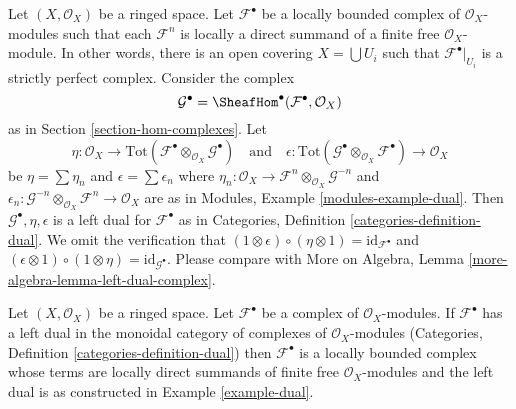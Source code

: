 \begin{example}
\label{example-dual}
Let $(X, \mathcal{O}_X)$ be a ringed space. Let $\mathcal{F}^\bullet$
be a locally bounded complex of $\mathcal{O}_X$-modules such that each
$\mathcal{F}^n$ is locally a direct summand of a finite
free $\mathcal{O}_X$-module. In other words, there is an open covering
$X = \bigcup U_i$ such that $\mathcal{F}^\bullet|_{U_i}$ is a strictly
perfect complex. Consider the complex
$$
\mathcal{G}^\bullet = \SheafHom^\bullet(\mathcal{F}^\bullet, \mathcal{O}_X)
$$
as in Section \ref{section-hom-complexes}. Let
$$
\eta :
\mathcal{O}_X
\to
\text{Tot}(\mathcal{F}^\bullet \otimes_{\mathcal{O}_X} \mathcal{G}^\bullet)
\quad\text{and}\quad
\epsilon :
\text{Tot}(\mathcal{G}^\bullet \otimes_{\mathcal{O}_X} \mathcal{F}^\bullet)
\to
\mathcal{O}_X
$$
be $\eta = \sum \eta_n$ and $\epsilon = \sum \epsilon_n$
where $\eta_n : \mathcal{O}_X \to
\mathcal{F}^n \otimes_{\mathcal{O}_X} \mathcal{G}^{-n}$
and
$\epsilon_n : \mathcal{G}^{-n} \otimes_{\mathcal{O}_X} \mathcal{F}^n
\to \mathcal{O}_X$ are as in Modules, Example \ref{modules-example-dual}.
Then $\mathcal{G}^\bullet, \eta, \epsilon$
is a left dual for $\mathcal{F}^\bullet$ as in
Categories, Definition \ref{categories-definition-dual}.
We omit the verification that
$(1 \otimes \epsilon) \circ (\eta \otimes 1) = \text{id}_{\mathcal{F}^\bullet}$
and
$(\epsilon \otimes 1) \circ (1 \otimes \eta) =
\text{id}_{\mathcal{G}^\bullet}$. Please compare with
More on Algebra, Lemma \ref{more-algebra-lemma-left-dual-complex}.
\end{example}

\begin{lemma}
\label{lemma-left-dual-complex}
Let $(X, \mathcal{O}_X)$ be a ringed space. Let $\mathcal{F}^\bullet$
be a complex of $\mathcal{O}_X$-modules. If $\mathcal{F}^\bullet$
has a left dual in the monoidal category of complexes of
$\mathcal{O}_X$-modules
(Categories, Definition \ref{categories-definition-dual})
then $\mathcal{F}^\bullet$ is a locally bounded complex whose terms are
locally direct summands of finite free $\mathcal{O}_X$-modules
and the left dual is as constructed in Example \ref{example-dual}.
\end{lemma}

